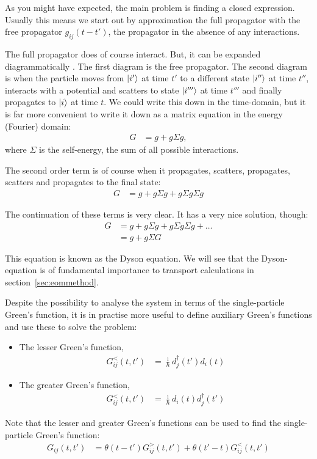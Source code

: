 As you might have expected, the main problem is finding a closed expression. Usually this means we start out by approximation the full propagator with the free propagator $g_{ij}(t-t')$, the propagator in the absence of any interactions. 

The full propagator does of course interact. But, it can be expanded diagrammatically \cite{mattuck}. The first diagram is the free propagator. The second diagram is when the particle moves from $\ket{i'}$ at time $t'$ to a different state $\ket{i''}$ at time $t''$, interacts with a potential and scatters to state $\ket{i'''}$ at time $t'''$ and finally propagates to $\ket{i}$ at time $t$. We could write this down in the time-domain, but it is far more convenient to write it down as a matrix equation in the energy (Fourier) domain:
\begin{align*}
G &= g + g \Sigma g,
\end{align*}
where $\Sigma$ is the self-energy, the sum of all possible interactions.

The second order term is of course when it propagates, scatters, propagates, scatters and propagates to the final state:
\begin{align*}
G &= g + g \Sigma g + g \Sigma g \Sigma g
\end{align*}

The continuation of these terms is very clear. It has a very nice solution, though:
\begin{align*}
G &= g + g \Sigma g + g \Sigma g \Sigma g+ \ldots \\
&= g + g \Sigma G
\end{align*}

This equation is known as the Dyson equation. We will see that the Dyson-equation is of fundamental importance to transport calculations in section~\ref{sec:eommethod}.

Despite the possibility to analyse the system in terms of the single-particle Green's function, it is in practise more useful to define auxiliary Green's functions and use these to solve the problem:
\begin{itemize}
\item The lesser Green's function, 
\begin{align*}
G^<_{ij}(t,t') &= \frac{\imath}{\hbar}d^\dagger_j(t')d_i(t)
\end{align*}
\item The greater Green's function, 
\begin{align*}
G^<_{ij}(t,t') &= \frac{\imath}{\hbar}d_i(t)d^\dagger_j(t')
\end{align*}
\end{itemize}
Note that the lesser and greater Green's functions can be used to find the single-particle Green's function:
\begin{align*}
G_{ij}(t,t') &= \theta(t-t')G^>_{ij} (t,t') + \theta(t'-t) G_{ij}^<(t,t')
\end{align*}

